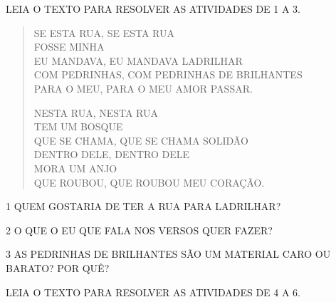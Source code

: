 
LEIA O TEXTO PARA RESOLVER AS ATIVIDADES DE 1 A 3.

\begin{myquote}
\begin{verse}
SE ESTA RUA, SE ESTA RUA\\
FOSSE MINHA\\
EU MANDAVA, EU MANDAVA LADRILHAR\\
COM PEDRINHAS, COM PEDRINHAS DE BRILHANTES\\
PARA O MEU, PARA O MEU AMOR PASSAR.

NESTA RUA, NESTA RUA\\
TEM UM BOSQUE\\
QUE SE CHAMA, QUE SE CHAMA SOLIDÃO\\
DENTRO DELE, DENTRO DELE\\
MORA UM ANJO\\
QUE ROUBOU, QUE ROUBOU MEU CORAÇÃO.
\end{verse}

\end{myquote}

\num{1} QUEM GOSTARIA DE TER A RUA PARA LADRILHAR?


\num{2} O QUE O EU QUE FALA NOS VERSOS QUER FAZER?


\num{3} AS PEDRINHAS DE BRILHANTES SÃO UM MATERIAL CARO OU BARATO? POR QUÊ?


LEIA O TEXTO PARA RESOLVER AS ATIVIDADES DE 4 A 6.


